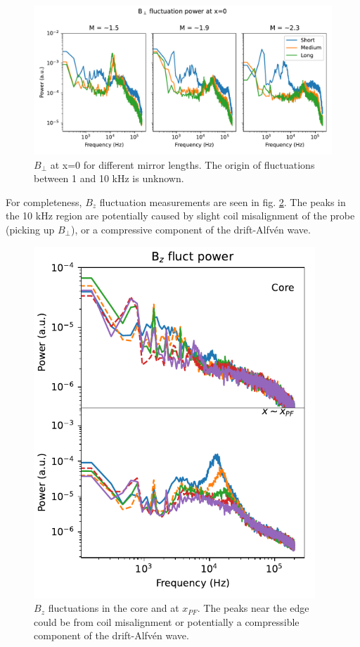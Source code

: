 \begin{figure}
    \centering
    \includegraphics[width=400pt]{figures/extra/Bperp_power_core_lengths.pdf}
    \caption[$B_\perp$ fluctuations at x=0 for different mirror lengths]{$B_\perp$ at x=0 for different mirror lengths. The origin of fluctuations between 1 and 10 kHz is unknown.}
    \label{fig_extra:Bperp_power_core_lengths}
\end{figure}

For completeness, $B_z$ fluctuation measurements are seen in fig. \ref{fig_extra:Bz}. The peaks in the 10 kHz region are potentially caused by slight coil misalignment of the probe (picking up $B_\perp$), or a compressive component of the drift-Alfv\'en wave.

\begin{figure}
    \centering
    \includegraphics[width=300pt]{figures/extra/Bz_fluct_power_core_edge.pdf}
    \caption[$B_z$ fluctuations in the core and $x_{PF}$]{$B_z$ fluctuations in the core and at $x_{PF}$. The peaks near the edge could be from coil misalignment or potentially a compressible component of the drift-Alfv\'en wave.}
    \label{fig_extra:Bz}
\end{figure}

